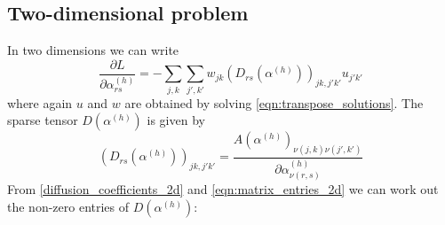 \documentclass[11pt]{article}
\begin{document}
\subsection{Two-dimensional problem}
In two dimensions we can write
\begin{equation}
\frac{\partial L}{\partial\alpha^{(h)}_{rs}} = -\sum_{j,k}\sum_{j',k'} w_{jk}(D_{rs}(\alpha^{(h)}))_{jk,j'k'} u_{j'k'}
\end{equation}
where again $u$ and $w$ are obtained by solving \eqref{eqn:transpose_solutions}. The sparse tensor $D(\alpha^{(h)})$ is given by
\begin{equation}
    (D_{rs}(\alpha^{(h)}))_{jk,j'k'} = \frac{A(\alpha^{(h)})_{\nu(j,k)\nu(j',k')}}{\partial \alpha^{(h)}_{\nu(r,s)}}
\end{equation}
From \eqref{diffusion_coefficients_2d} and \eqref{eqn:matrix_entries_2d} we can work out the non-zero entries of $D(\alpha^{(h)})$:
\end{document}
